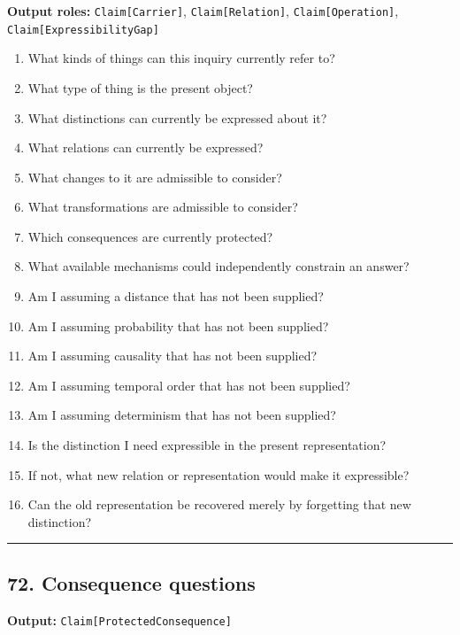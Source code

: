 \documentclass[
]{article}
\providecommand{\tightlist}{%
  \setlength{\itemsep}{0pt}\setlength{\parskip}{0pt}}
\begin{document}
\textbf{Output roles:} \texttt{Claim{[}Carrier{]}},
\texttt{Claim{[}Relation{]}}, \texttt{Claim{[}Operation{]}},
\texttt{Claim{[}ExpressibilityGap{]}}

\begin{enumerate}
\def\labelenumi{\arabic{enumi}.}
\tightlist
\item
  What kinds of things can this inquiry currently refer to?
\item
  What type of thing is the present object?
\item
  What distinctions can currently be expressed about it?
\item
  What relations can currently be expressed?
\item
  What changes to it are admissible to consider?
\item
  What transformations are admissible to consider?
\item
  Which consequences are currently protected?
\item
  What available mechanisms could independently constrain an answer?
\item
  Am I assuming a distance that has not been supplied?
\item
  Am I assuming probability that has not been supplied?
\item
  Am I assuming causality that has not been supplied?
\item
  Am I assuming temporal order that has not been supplied?
\item
  Am I assuming determinism that has not been supplied?
\item
  Is the distinction I need expressible in the present representation?
\item
  If not, what new relation or representation would make it expressible?
\item
  Can the old representation be recovered merely by forgetting that new
  distinction?
\end{enumerate}

\begin{center}\rule{0.5\linewidth}{0.5pt}\end{center}

\subsection{72. Consequence questions}\label{consequence-questions}

\textbf{Output:} \texttt{Claim{[}ProtectedConsequence{]}}
\end{document}
